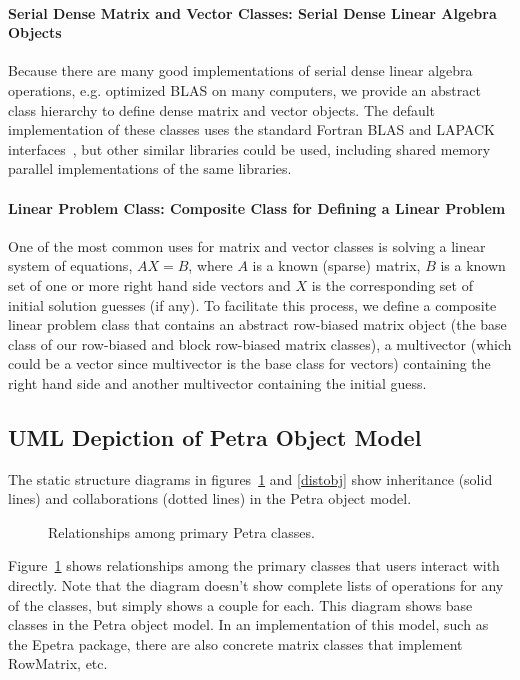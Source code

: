 \documentclass[12pt,relax]{PetraObjectModel}
\begin{document}
\paragraph{Serial Dense Matrix and Vector Classes:  Serial Dense Linear Algebra Objects}

Because there are many good implementations of serial dense linear algebra
operations, e.g. optimized BLAS on many computers, we provide an abstract
class hierarchy to define dense matrix and vector objects.  The default
implementation of these classes uses the standard Fortran BLAS and LAPACK
interfaces~\cite{BLAS1,BLAS2,BLAS3,LAPACK}, but other similar libraries could
be used, including shared memory parallel implementations of the same
libraries.

\paragraph{Linear Problem Class:  Composite Class for Defining a Linear Problem}

One of the most common uses for matrix and vector classes is solving a linear
system of equations, $AX = B$, where $A$ is a known (sparse) matrix, $B$ is a
known set of one or more right hand side vectors and $X$ is the corresponding
set of initial solution guesses (if any).  To facilitate this process, we
define a composite linear problem class that contains an abstract row-biased
matrix object (the base class of our row-biased and block row-biased matrix
classes), a multivector (which could be a vector since multivector is the base
class for vectors) containing the right hand side and another multivector
containing the initial guess.

\subsection{UML Depiction of Petra Object Model}

The static structure diagrams in figures~\ref{matvecmap} and \ref{distobj}
show inheritance (solid lines) and collaborations (dotted lines) in the
Petra object model.
\begin{figure}[ht]
\begin{center}
\caption{Relationships among primary Petra classes.}
\label{matvecmap}
\end{center}
\end{figure}
Figure~\ref{matvecmap} shows relationships among the primary classes that users
interact with directly. Note that the diagram doesn't show complete lists of
operations for any of the classes, but simply shows a couple for each. This
diagram shows base classes in the Petra object model. In an implementation of
this model, such as the Epetra package, there are also concrete matrix classes
that implement RowMatrix, etc.  
\end{document}
